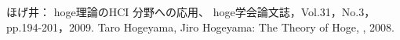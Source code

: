 \begin{thebibliography}[90]
  \mbox{}
    ほげ井：
    \newblock hoge理論のHCI 分野への応用、
    \newblock hoge学会論文誌，Vol.31，No.3，pp.194-201，2009.
    Taro Hogeyama, Jiro Hogeyama:
    \newblock The Theory of Hoge,
    , 2008.
\end{thebibliography}
